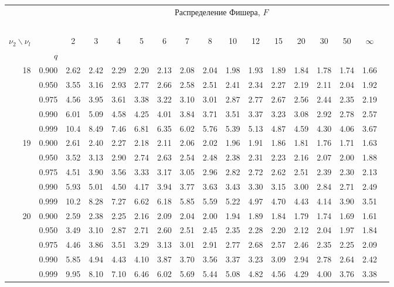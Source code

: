 \documentclass[pdftex,11pt,openany]{book}\usepackage[]{graphicx}\usepackage[]{color}
\begin{document}
{\begin{center}
\begin{tabular}{rrr@{\,}r@{\,}r@{\,}r@{\,}r@{\,}r@{\,}r@{\,}r
                   @{\,}r@{\,}r@{\,}r@{\,}r@{\,}r@{\,}r@{\,}r}
&&\multicolumn{14}{c}{Распределение Фишера, $F$}\\
\ \\
$\nu_2\backslash\nu_l$ & & 
\multicolumn{1}{c}{2} &\multicolumn{1}{c}{3} &
\multicolumn{1}{c}{4} &\multicolumn{1}{c}{5} &
\multicolumn{1}{c}{6} &\multicolumn{1}{c}{7} &
\multicolumn{1}{c}{8} &\multicolumn{1}{c}{10}&
\multicolumn{1}{c}{12}&\multicolumn{1}{c}{15}&
\multicolumn{1}{c}{20}&\multicolumn{1}{c}{30}&
\multicolumn{1}{c}{50}&\multicolumn{1}{c}{$\infty$}\\
& $q$ \\
18&0.900&2.62&2.42&2.29&2.20&2.13&2.08&2.04&1.98&1.93&1.89&1.84&1.78&1.74&1.66\\
  &0.950&3.55&3.16&2.93&2.77&2.66&2.58&2.51&2.41&2.34&2.27&2.19&2.11&2.04&1.92\\
  &0.975&4.56&3.95&3.61&3.38&3.22&3.10&3.01&2.87&2.77&2.67&2.56&2.44&2.35&2.19\\
  &0.990&6.01&5.09&4.58&4.25&4.01&3.84&3.71&3.51&3.37&3.23&3.08&2.92&2.78&2.57\\
  &0.999&10.4&8.49&7.46&6.81&6.35&6.02&5.76&5.39&5.13&4.87&4.59&4.30&4.06&3.67\\
19&0.900&2.61&2.40&2.27&2.18&2.11&2.06&2.02&1.96&1.91&1.86&1.81&1.76&1.71&1.63\\
  &0.950&3.52&3.13&2.90&2.74&2.63&2.54&2.48&2.38&2.31&2.23&2.16&2.07&2.00&1.88\\
  &0.975&4.51&3.90&3.56&3.33&3.17&3.05&2.96&2.82&2.72&2.62&2.51&2.39&2.30&2.13\\
  &0.990&5.93&5.01&4.50&4.17&3.94&3.77&3.63&3.43&3.30&3.15&3.00&2.84&2.71&2.49\\
  &0.999&10.2&8.28&7.27&6.62&6.18&5.85&5.59&5.22&4.97&4.70&4.43&4.14&3.90&3.51\\
20&0.900&2.59&2.38&2.25&2.16&2.09&2.04&2.00&1.94&1.89&1.84&1.79&1.74&1.69&1.61\\
  &0.950&3.49&3.10&2.87&2.71&2.60&2.51&2.45&2.35&2.28&2.20&2.12&2.04&1.97&1.84\\
  &0.975&4.46&3.86&3.51&3.29&3.13&3.01&2.91&2.77&2.68&2.57&2.46&2.35&2.25&2.09\\
  &0.990&5.85&4.94&4.43&4.10&3.87&3.70&3.56&3.37&3.23&3.09&2.94&2.78&2.64&2.42\\
  &0.999&9.95&8.10&7.10&6.46&6.02&5.69&5.44&5.08&4.82&4.56&4.29&4.00&3.76&3.38\\

\end{tabular}
\end{center}}
\end{document}
